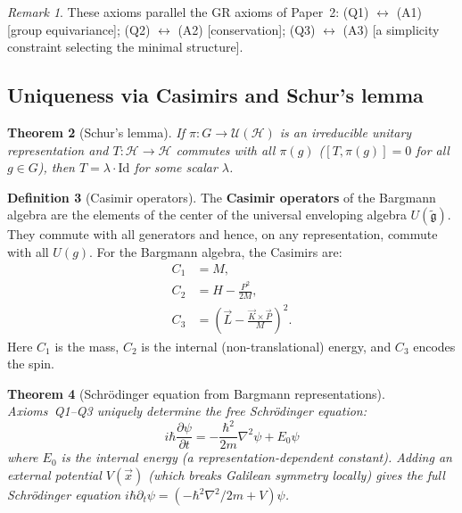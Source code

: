 \documentclass[12pt]{article}
\theoremstyle{plain}
\newtheorem{theorem}{Theorem}[section]
\theoremstyle{definition}
\newtheorem{definition}[theorem]{Definition}
\theoremstyle{remark}
\newtheorem{remark}[theorem]{Remark}
\begin{document}
\begin{remark}
These axioms parallel the GR axioms of Paper~2: (Q1) $\leftrightarrow$ (A1) [group equivariance]; (Q2) $\leftrightarrow$ (A2) [conservation]; (Q3) $\leftrightarrow$ (A3) [a simplicity constraint selecting the minimal structure].
\end{remark}

\subsection{Uniqueness via Casimirs and Schur's lemma}

\begin{theorem}[Schur's lemma]\label{thm:schur}
If $\pi: G \to \mathcal{U}(\mathcal{H})$ is an irreducible unitary representation and $T: \mathcal{H} \to \mathcal{H}$ commutes with all $\pi(g)$ ($[T, \pi(g)] = 0$ for all $g \in G$), then $T = \lambda \cdot \mathrm{Id}$ for some scalar $\lambda$.
\end{theorem}

\begin{definition}[Casimir operators]\label{def:casimirs-bargmann}
The \textbf{Casimir operators} of the Bargmann algebra are the elements of the center of the universal enveloping algebra $U(\widetilde{\mathfrak{g}})$. They commute with all generators and hence, on any representation, commute with all $U(g)$. For the Bargmann algebra, the Casimirs are:
\begin{align}
C_1 &= M, \label{eq:C1-gal}\\
C_2 &= H - \frac{P^2}{2M}, \label{eq:C2-gal}\\
C_3 &= \left(\vec{L} - \frac{\vec{K} \times \vec{P}}{M}\right)^2. \label{eq:C3-gal}
\end{align}
Here $C_1$ is the mass, $C_2$ is the internal (non-translational) energy, and $C_3$ encodes the spin.
\end{definition}

\begin{theorem}[Schr\"odinger equation from Bargmann representations]\label{thm:schrodinger}
Axioms~Q1--Q3 uniquely determine the free Schr\"odinger equation:
\begin{equation}\label{eq:schrodinger}
\boxed{i\hbar\frac{\partial\psi}{\partial t} = -\frac{\hbar^2}{2m}\nabla^2\psi + E_0\psi}
\end{equation}
where $E_0$ is the internal energy (a representation-dependent constant). Adding an external potential $V(\vec{x})$ (which breaks Galilean symmetry locally) gives the full Schr\"odinger equation $i\hbar\partial_t\psi = (-\hbar^2\nabla^2/2m + V)\psi$.
\end{theorem}
\end{document}
